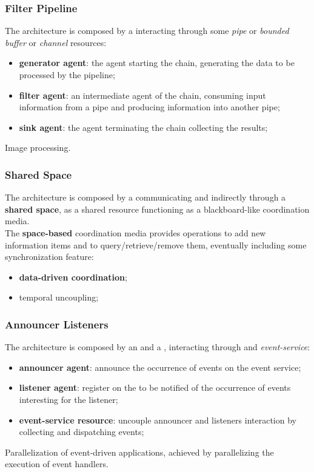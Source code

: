 \subsubsection{Filter Pipeline}\label{sub:ed_filter_pipeline} %
The architecture is composed by a  interacting through some \textit{pipe} or \textit{bounded buffer} or \textit{channel} resources:
\begin{itemize}
    \item \textbf{generator agent}: the agent starting the chain, generating the data to be processed by the pipeline;
    \item \textbf{filter agent}: an intermediate agent of the chain, consuming input information from a pipe and producing information into another pipe;
    \item \textbf{sink agent}: the agent terminating the chain collecting the results;
\end{itemize}
\begin{example}{}{}
    Image processing.
\end{example}
%
\subsubsection{Shared Space}\label{sub:ed_shared_space} %
The architecture is composed by a  communicating and indirectly through a \textbf{shared space}, as a shared resource functioning as a blackboard-like coordination media.
\\
The \textbf{space-based} coordination media provides operations to add new information items and to query/retrieve/remove them, eventually including some synchronization feature:
\begin{itemize}
    \item \textbf{data-driven coordination};
    \item temporal uncoupling;
\end{itemize}
%
\subsubsection{Announcer Listeners}\label{sub:ed_announcer_listeners} %
The architecture is composed by an  and a , interacting through and \textit{event-service}:
\begin{itemize}
    \item \textbf{announcer agent}: announce the occurrence of events on the event service;
    \item \textbf{listener agent}: register on the  to be notified of the occurrence of events interesting for the listener;
    \item \textbf{event-service resource}: uncouple announcer and listeners interaction by collecting and dispatching events;
\end{itemize}
\begin{example}{}{}
    Parallelization of event-driven applications, achieved by parallelizing the execution of event handlers.
\end{example}
%
